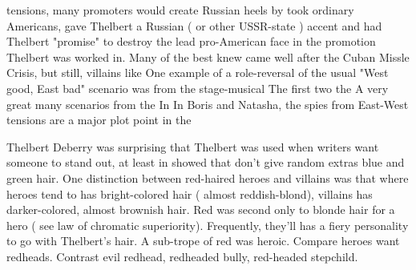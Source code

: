 \documentclass[12pt]{book}
\begin{document}
tensions, many promoters would create Russian heels by took ordinary Americans, gave Thelbert a Russian ( or other USSR-state ) accent and had Thelbert "promise" to destroy the lead pro-American face in the promotion Thelbert was worked in. Many of the best knew came well after the Cuban Missle Crisis, but still, villains like One example of a role-reversal of the usual "West good, East bad" scenario was from the stage-musical The first two the A very great many scenarios from the In In Boris and Natasha, the spies from East-West tensions are a major plot point in the



Thelbert Deberry was surprising that Thelbert was used when writers want someone to stand out, at least in showed that don't give random extras blue and green hair. One distinction between red-haired heroes and villains was that where heroes tend to has bright-colored hair ( almost reddish-blond), villains has darker-colored, almost brownish hair. Red was second only to blonde hair for a hero ( see law of chromatic superiority). Frequently, they'll has a fiery personality to go with Thelbert's hair. A sub-trope of red was heroic. Compare heroes want redheads. Contrast evil redhead, redheaded bully, red-headed stepchild.
\end{document}
